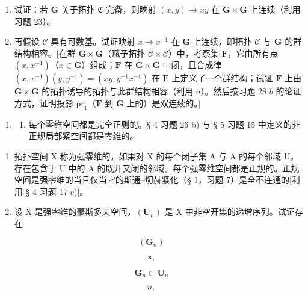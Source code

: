 \begin{enumerate}
\def\labelenumi{\alph{enumi})}
\item
  试证：若 \(\mathbf{G}\) 关于拓扑 \(\mathfrak{C}\) 完备，则映射 \((x,y)\to xy\) 在 \(\mathbf{G}\times\mathbf{G}\) 上连续（利用习题 23）。
\item
  再假设 \(\mathcal{C}\) 具有可数基。试证映射 \(x \to x^{-1}\) 在 \(\mathbf{G}\) 上连续，即拓扑 \(\mathcal{C}\) 与 \(\mathbf{G}\) 的群结构相容。{[}在群 \(\mathbf{G} \times \mathbf{G}\)（赋予拓扑 \(\mathcal{C} \times \mathcal{C}\)）中，考察集 \(\mathbf{F}\)，它由所有点 \((x, x^{-1})\)（\(x \in \mathbf{G}\)）组成；\(\mathbf{F}\) 在 \(\mathbf{G} \times \mathbf{G}\) 中闭，且合成律 \((x, x^{-1})(y, y^{-1}) = (xy, y^{-1}x^{-1})\) 在 \(\mathbf{F}\) 上定义了一个群结构；试证 \(\mathbf{F}\) 上由 \(\mathbf{G} \times \mathbf{G}\) 的拓扑诱导的拓扑与此群结构相容（利用 \(a\)）。然后按习题 28 \(b\) 的论证方式，证明投影 \(\mathrm{pr}_1\)（\(\mathbf{F}\) 到 \(\mathbf{G}\) 上的）是双连续的。{]}
\end{enumerate}

\ExerciseSection

\begin{enumerate}
\def\labelenumi{\arabic{enumi})}
\tightlist
\item
  \begin{enumerate}
  \def\labelenumii{\alph{enumii})}
  \tightlist
  \item
    每个零维空间都是完全正则的。§ 4 习题 26 b) 与 § 5 习题 15 中定义的非正规局部紧空间都是零维的。
  \end{enumerate}
\end{enumerate}

\begin{enumerate}
\def\labelenumi{\alph{enumi})}
\setcounter{enumi}{1}
\item
  拓扑空间 X 称为强零维的，如果对 X 的每个闭子集 A 与 A 的每个邻域 U，存在包含于 U 中的 A 的既开又闭的邻域。每个强零维空间都是正规的。正规空间是强零维的当且仅当它的斯通–切赫紧化（§ 1，习题 7）是全不连通的{[}利用 § 4 习题 17 c){]}。
\item
  设 X 是强零维的豪斯多夫空间，\((\mathbf{U}_{n})\) 是 X 中非空开集的递增序列。试证存在
\end{enumerate}

\[
\left(\mathbf {G} _ {n}\right)
\]

\[
\mathbf {x},
\]

\[
\mathbf {G} _ {n} \subset \mathbf {U} _ {n}
\]

\[
n,
\]

